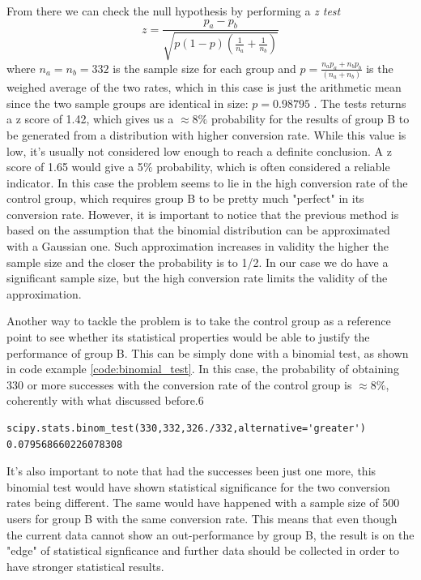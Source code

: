 \documentclass[paper=a4, fontsize=10pt]{report}
\begin{document}
From there we can check the null hypothesis by performing a \textit{z test}
\begin{equation}
 z = \frac{p_{a}-p_{b}}{\sqrt{p(1-p)(\frac{1}{n_{a}} + \frac{1}{n_{b}})}}
\end{equation}
where $n_{a} = n_{b} = 332 $ is the sample size for each group and $ p = \frac{n_{a}p_{a} + n_{b}p_{b}}{ (n_{a} + n_{b})}$ is the weighed average of the two rates,
which in this case is just the arithmetic mean since the two sample groups are identical in size: $p = 0.98795$
. The tests returns a z score of 1.42, which gives us a $\approx 8\%$ probability for the results of group B to be generated from a distribution with higher
conversion rate.
While this value is low, it's usually not considered low enough to reach a definite conclusion. A z score of 1.65 would give a 5$\%$ probability,
which is often considered a reliable indicator. In this case the problem seems to lie in the high conversion rate of the control group,
which requires group B to be pretty much "perfect" in its conversion rate.
However, it is important to notice that the previous method is based on the assumption that the binomial distribution can be approximated with a Gaussian one.
Such approximation increases in validity the higher the sample size and the closer the probability is to 1/2. In our case we do have a significant sample size, but the 
high conversion rate limits the validity of the approximation.

Another way to tackle the problem is to take the control group as a reference point to see whether its statistical properties would be
able to justify the performance of group B. This can be simply done with a binomial test, as shown in code example \ref{code:binomial_test}. In this case, 
the probability
of obtaining 330 or more successes with the conversion rate of the control group is $\approx 8\%$, coherently with what discussed before.6

\footnotesize
\begin{lstlisting}[frame=single,caption= Binomial Test\label{code:binomial_test}]
scipy.stats.binom_test(330,332,326./332,alternative='greater')
0.079568660226078308
\end{lstlisting}
\normalsize

It's also important to note that had the successes been just one more, this binomial test would have shown statistical significance
for the two conversion rates being different. The same would have happened with a sample size of 500 users for group B with the 
same conversion rate.
This means that even though the current data cannot show an out-performance by 
group B, the result is on the "edge" of statistical signficance and further data should be collected in order to have stronger
statistical results.
\end{document}

